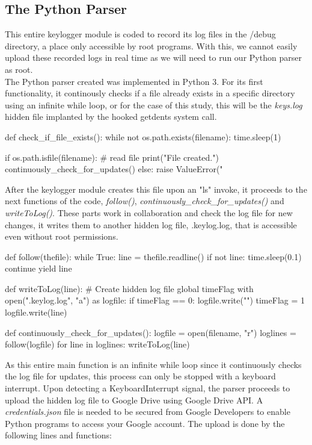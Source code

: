 \documentclass[conference]{IEEEtran}
\newcommand\tab[1][0.5cm]{\hspace*{#1}}
\begin{document}
	\subsection{The Python Parser}
	This entire keylogger module is coded to record its log files in the /debug directory, a place only accessible by root programs. With this, we cannot easily upload these recorded logs in real time as we will need to run our Python parser as root. \\
	\tab The Python parser created was implemented in Python 3. For its first functionality, it continously checks if a file already exists in a specific directory using an infinite while loop, or for the case of this study, this will be the \emph{keys.log} hidden file implanted by the hooked getdents system call. 
	
	\begin{python}
def check_if_file_exists():
	while not os.path.exists(filename):
		time.sleep(1)
	
	if os.path.isfile(filename):
		# read file
		print("File created.")
		continuously_check_for_updates()
	else:
		raise ValueError("%
	\end{python}
	
	After the keylogger module creates this file upon an "ls" invoke, it proceeds to the next functions of the code, \emph{follow()}, \emph{continuously\_check\_for\_updates()} and \emph{writeToLog()}. These parts work in collaboration and check the log file for new changes, it writes them to another hidden log file, .keylog.log, that is accessible even without root permissions. 
	
	\begin{python}
def follow(thefile):
	while True:
		line = thefile.readline()
		if not line:
			time.sleep(0.1)
			continue
		yield line

def writeToLog(line):
	# Create hidden log file
	global timeFlag
	with open(".keylog.log", "a") as logfile:
		if timeFlag == 0:
			logfile.write("\n\n[LOG CREATED AT: "
			+ str(current_time) + " | " +
			str(today) + "]\n\n")
			timeFlag = 1
		logfile.write(line)

def continuously_check_for_updates():
	logfile = open(filename, "r")
	loglines = follow(logfile)
	for line in loglines:
		writeToLog(line)
	\end{python}
	
	As this entire main function is an infinite while loop since it continuously checks the log file for updates, this process can only be stopped with a keyboard interrupt. Upon detecting a KeyboardInterrupt signal, the parser proceeds to upload the hidden log file to Google Drive using Google Drive API. A \emph{credentials.json} file is needed to be secured from Google Developers to enable Python programs to access your Google account. The upload is done by the following lines and functions:
	
\end{document}
